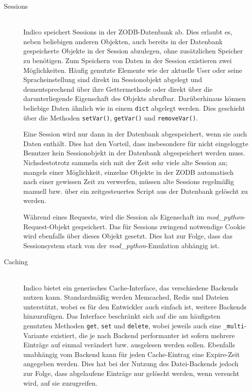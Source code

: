 \begin{description}
\item[Sessions] \hfill \\
Indico speichert Sessions in der ZODB-Datenbank ab. Dies erlaubt es, neben beliebigen anderen
Objekten, auch bereits in der Datenbank gespeicherte Objekte in der Session abzulegen, ohne
zusätzlichen Speicher zu benötigen. Zum Speichern von Daten in der Session existieren zwei
Möglichkeiten. Häufig genutzte Elemente wie der aktuelle User oder seine Spracheinstellung sind
direkt im Sessionobjekt abgelegt und dementsprechend über ihre Gettermethode oder direkt über die
darunterliegende Eigenschaft des Objekts abrufbar. Darüberhinaus können beliebige Daten ähnlich wie
in einem \lstinline{dict} abgelegt werden. Dies geschieht über die Methoden \lstinline{setVar()},
\lstinline{getVar()} und \lstinline{removeVar()}.

Eine Session wird nur dann in der Datenbank abgespeichert, wenn sie auch Daten enthält. Dies hat den
Vorteil, dass insbesondere für nicht eingeloggte Benutzer kein Sessionobjekt in der Datenbank
abgespeichert werden muss. Nichsdestotrotz sammeln sich mit der Zeit sehr viele alte Session an;
mangels einer Möglichkeit, einzelne Objekte in der ZODB automatisch nach einer gewissen Zeit zu
verwerfen, müssen alte Sessions regelmäßig manuell bzw. über ein zeitgesteuertes Script aus der
Datenbank gelöscht zu werden.

Während eines Requests, wird die Session als Eigenschaft im \emph{mod\_python}-Request-Objekt
gespeichert. Das für Sessions zwingend notwendige Cookie wird ebenfalls über dieses Objekt
gesetzt. Dies hat zur Folge, dass das Sessionsystem stark von der \emph{mod\_python}-Emulation
abhängig ist.


\item[Caching] \hfill \\
Indico bietet ein generisches Cache-Interface, das verschiedene Backends nutzen kann.
Standardmäßig werden Memcached, Redis und Dateien unterstützt, wobei es für den Entwickler auch
einfach ist, weitere Backends hinzuzufügen. Das Interface beschränkt sich auf die am häufigsten
genutzten Methoden \lstinline{get}, \lstinline{set} und \lstinline{delete}, wobei jeweils auch
eine \lstinline{_multi}-Variante existiert, die je nach Backend performanter ist sofern mehrere
Einträge auf einmal verändert bzw. ausgelesen werden sollen. Ebenfalls unabhängig vom Backend kann
für jeden Cache-Eintrag eine Expire-Zeit angegeben werden. Dies hat bei der Nutzung des
Datei-Backends jedoch zur Folge, dass abgelaufene Einträge nur gelöscht werden, wenn versucht wird,
auf sie zuzugreifen.


\end{description}
